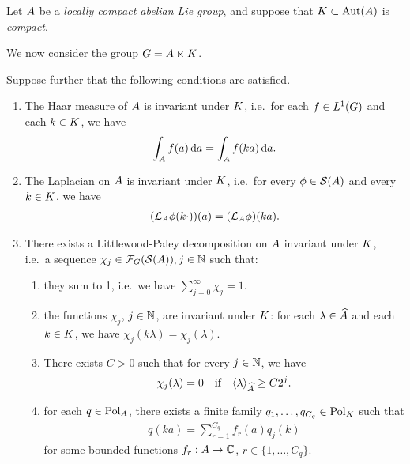 \begin{theorem}
\label{theorem:Littlewood-Paley_decomposition}
    Let $\AbelianGroup$ be a \emph{locally compact abelian Lie group},
    and suppose that $\CompactGroup \subset \Aut(\AbelianGroup)$ is \emph{compact}.

    We now consider the group $\Group = \AbelianGroup \ltimes \CompactGroup$.

    Suppose further that the following conditions are satisfied.
    \begin{enumerate}
        \item The Haar measure of $\AbelianGroup$ is invariant under $\CompactGroup$,
            i.e.\ for each $f \in \Lebesgue{1}{\Group}$ and each $k \in \CompactGroup$, we have
            \begin{align*}
                \int_\AbelianGroup f(a) \dd a = \int_\AbelianGroup f(k a) \dd a.
            \end{align*}
        \item The Laplacian on $\AbelianGroup$ is invariant under $\CompactGroup$,
            i.e.\ for every $\phi \in \Schwartz\AbelianGroup$ and every $k \in \CompactGroup$, we have
            \begin{align*}
                (\Laplacian[\AbelianGroup] \phi(k \dummy))(a)
                = (\Laplacian[\AbelianGroup] \phi)(k a).
            \end{align*}
        \item There exists a Littlewood-Paley decomposition on $\AbelianGroup$ invariant under $\CompactGroup$,
            i.e.\ a sequence $\chi_j \in \Fourier(\Schwartz\AbelianGroup), j \in \N$ such that:
            \begin{enumerate}
                \item they sum to 1, i.e.\ we have $\sum_{j = 0}^\infty \chi_j = 1$.
                \item the functions $\chi_j$, $j \in \N$, are invariant under $\CompactGroup$:
                    for each $\lambda \in \dualGroup\AbelianGroup$ and each $k \in \CompactGroup$, we have $\chi_j(k \lambda) = \chi_j(\lambda)$.
                \item There exists $C > 0$ such that for every $j \in \N$, we have
                    \begin{align*}
                        \chi_j(\lambda) = 0 \quad \text{if} \quad \JapaneseBracket{\AbelianGroup}{\lambda} \geq C 2^j.
                    \end{align*}
                \item for each $q \in \Polynomials\AbelianGroup$,
                    there exists a finite family $q_1, \dots, q_{C_q} \in \Polynomials\CompactGroup$ such that
                    \begin{align*}
                        q(k a) = \sum_{r = 1}^{C_q} f_r(a) q_j(k)
                    \end{align*}
                    for some bounded functions $f_r : A \to \C$, $r \in \{1, \dots, C_q\}$.
            \end{enumerate}
    \end{enumerate}


\end{theorem}
